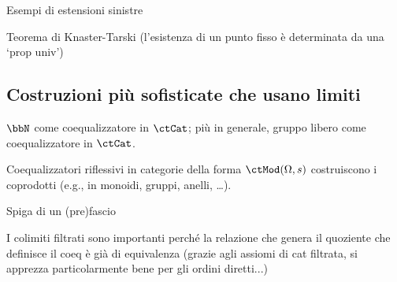 \begin{examples}\label{exas_estensioni_sinistre}
 Esempi di estensioni sinistre
\end{examples}
\begin{theorem}
 Teorema di Knaster-Tarski (l'esistenza di un punto fisso è determinata da una `prop univ')
\end{theorem}
\subsection{Costruzioni più sofisticate che usano limiti}
\begin{example}\label{ex_N_coequalizzatore_ctCat}
 \(\bbN\) come coequalizzatore in \(\ctCat\); più in generale, gruppo libero come coequalizzatore in \(\ctCat\).
\end{example}

\begin{example}\label{ex_coequalizzatori_riflessivi_ctMod}
 Coequalizzatori riflessivi in categorie della forma \(\ctMod(\Omega,s)\) costruiscono i coprodotti (e.g., in monoidi, gruppi, anelli, \dots).
\end{example}

\begin{proposition}\label{prop_categorie_filtrate_setacciate}
\end{proposition}

\begin{definition}\label{def_funtore_sottooggetti}
\end{definition}

\begin{example}\label{ex_spiga_prefascio}
 Spiga di un (pre)fascio
\end{example}

\begin{remark}\label{mk_colimiti_filtrati_quoziente}
 I colimiti filtrati sono importanti perché la relazione che genera il quoziente che definisce il coeq è già di equivalenza (grazie agli assiomi di cat filtrata, si apprezza particolarmente bene per gli ordini diretti...)
\end{remark}

